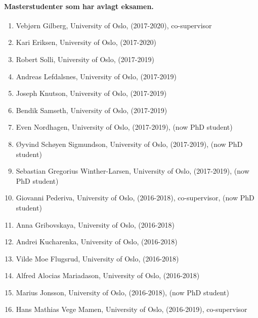 \documentclass[aps,floatfix,preprint]{revtex4-1}
\begin{document}
\noindent
\paragraph*{Masterstudenter som har avlagt eksamen.}
\begin{enumerate}
\item Vebjørn Gilberg, University of Oslo, (2017-2020), co-supervisor

\item Kari Eriksen, University of Oslo, (2017-2020)

\item Robert Solli, University of Oslo, (2017-2019)

\item Andreas Lefdalsnes, University of Oslo, (2017-2019)

\item Joseph Knutson, University of Oslo, (2017-2019)

\item Bendik Samseth, University of Oslo, (2017-2019)

\item Even Nordhagen, University of Oslo, (2017-2019), (now PhD student)

\item Øyvind Schøyen Sigmundson, University of Oslo, (2017-2019), (now PhD student)

\item Sebastian Gregorius Winther-Larsen, University of Oslo, (2017-2019),  (now PhD student)

\item Giovanni Pederiva, University of Oslo, (2016-2018), co-supervisor,  (now PhD student)

\item Anna Gribovskaya, University of Oslo, (2016-2018)

\item Andrei Kucharenka, University of Oslo, (2016-2018)

\item Vilde Moe Flugsrud, University of Oslo, (2016-2018)

\item Alfred Alocias Mariadason, University of Oslo, (2016-2018)

\item Marius Jonsson, University of Oslo, (2016-2018),  (now PhD student)

\item Hans Mathias Vege Mamen, University of Oslo, (2016-2019), co-supervisor


\end{enumerate}
\end{document}

